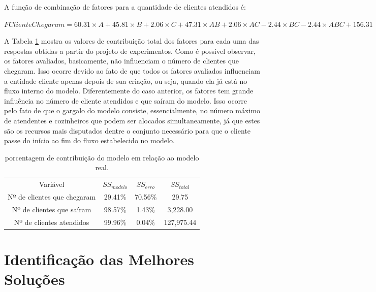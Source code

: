 \documentclass[pt,disc,oneside]{ufscpgeasthesis}
\begin{document}
			A função de combinação de fatores para a quantidade de clientes atendidos é:

			\begin{center}
				\large{$FClienteChegaram = 60.31 \times A + 45.81 \times B + 2.06 \times C + 47.31 \times AB + 2.06 \times AC - 2.44 \times BC - 2.44 \times ABC + 156.31$}
			\end{center}

			A Tabela \ref{table:resultsValues} mostra os valores de contribuição total dos fatores para cada uma das respostas obtidas a partir do projeto de experimentos.
			Como é possível observar, os fatores avaliados, basicamente, não influenciam o número de clientes que chegaram.
			Isso ocorre devido ao fato de que todos os fatores avaliados influenciam a entidade cliente apenas depois de sua criação, ou seja, quando ela já está no fluxo interno do modelo.
			Diferentemente do caso anterior, os fatores tem grande influência no número de cliente atendidos e que saíram do modelo.
			Isso ocorre pelo fato de que o gargalo do modelo consiste, essencialmente, no número máximo de atendentes e cozinheiros que podem ser alocados simultaneamente, já que estes são os recursos mais disputados dentre o conjunto necessário para que o cliente passe do início ao fim do fluxo estabelecido no modelo.


			\begin{table}[!ht]
				\centering
				\begin{tabular}{c|c|c|c}
					\rowcolor{gray!70} Variável 					& $SS_{modelo}$	& $SS_{erro}$	& $SS_{total}$	\\
					\rowcolor{gray!20} Nº de clientes que chegaram 	& 29.41\%		& 70.56\%	& 29.75			\\
					\rowcolor{gray!40} Nº de clientes que saíram	& 98.57\%		& 1.43\%	& 3,228.00		\\
					\rowcolor{gray!20} Nº de clientes atendidos		& 99.96\%		& 0.04\%	& 127,975.44	\\
				\end{tabular}
				\caption{porcentagem de contribuição do modelo em relação ao modelo real.}
				\label{table:resultsValues}
			\end{table}

		\section{Identificação das Melhores Soluções}
		\label{sec:identificacao}
\end{document}
